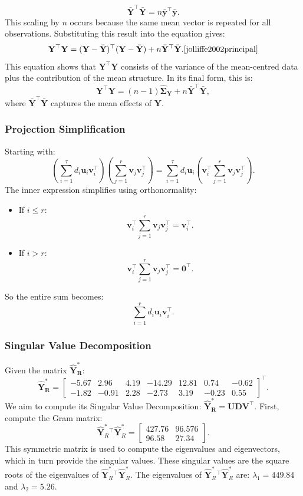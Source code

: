 \documentclass[11pt]{report} %
\begin{document}
\[
   \bar{\mathbf{Y}}^\top \bar{\mathbf{Y}} = n \bar{\mathbf{y}}^\top \bar{\mathbf{y}}.
\]
This scaling by \( n \) occurs because the same mean vector is repeated for all observations. Substituting this result into the equation gives:
\[
   \mathbf{Y}^\top \mathbf{Y} = (\mathbf{Y} - \bar{\mathbf{Y}})^\top (\mathbf{Y} - \bar{\mathbf{Y}}) + n \bar{\mathbf{Y}}^\top \bar{\mathbf{Y}}.\cite{jolliffe2002principal}
\]
This equation shows that \( \mathbf{Y}^\top \mathbf{Y} \) consists of the variance of the mean-centred data plus the contribution of the mean structure. In its final form, this is:
\[
\mathbf{Y}^\top\mathbf{Y} = (n-1)\mathbf{\hat{\Sigma}_Y}+n\mathbf{\bar{Y}}^\top\mathbf{\bar{Y}},
\]
where $\mathbf{\bar{Y}}^\top\mathbf{\bar{Y}}$ captures the mean effects of $\mathbf{Y}$. 

\subsubsection{Projection Simplification}
\label{proj}
Starting with:
\[
\left( \sum_{i=1}^{\tau} d_i \mathbf{u}_i \mathbf{v}_i^\top \right)
\left( \sum_{j=1}^{r} \mathbf{v}_j \mathbf{v}_j^\top \right)
= \sum_{i=1}^{\tau} d_i \mathbf{u}_i 
\left( \mathbf{v}_i^\top \sum_{j=1}^{r} \mathbf{v}_j \mathbf{v}_j^\top \right).
\]
The inner expression simplifies using orthonormality:
\begin{itemize}
  \item If \( i \leq r \): 
  \[
  \mathbf{v}_i^\top \sum_{j=1}^{r} \mathbf{v}_j \mathbf{v}_j^\top = \mathbf{v}_i^\top.
  \]
  \item If \( i > r \): 
  \[
  \mathbf{v}_i^\top \sum_{j=1}^{r} \mathbf{v}_j \mathbf{v}_j^\top = \mathbf{0}^\top.
  \]
\end{itemize}
\noindent So the entire sum becomes:
\[
\sum_{i=1}^{r} d_i \mathbf{u}_i \mathbf{v}_i^\top.
\]

\subsubsection{Singular Value Decomposition}
\label{RRR SVD}
Given the matrix \( \mathbf{\hat{Y}^*_R} \):
\[
\mathbf{\hat{Y}^*_R} =
\begin{bmatrix}
-5.67 & 2.96 & 4.19 & -14.29 & 12.81 & 0.74 & -0.62 \\
-1.82 & -0.91 & 2.28 & -2.73 & 3.19 & -0.23 & 0.55
\end{bmatrix}^{\top}.
\]
We aim to compute its Singular Value Decomposition: 
$
\mathbf{\hat{Y}^*_R} = \mathbf{U D V}^\top.
$
First, compute the Gram matrix:
\[
\hat{\mathbf{Y}}_R^*{}^\top \hat{\mathbf{Y}}_R^* =
\begin{bmatrix}
427.76 & 96.576 \\
96.58 & 27.34
\end{bmatrix}.
\]
This symmetric matrix is used to compute the eigenvalues and eigenvectors, which in turn provide the singular values. These singular values are the square roots of the eigenvalues of \( \hat{\mathbf{Y}}_R^*{}^\top \hat{\mathbf{Y}}_R^* \). The eigenvalues of \( \hat{\mathbf{Y}}_R^*{}^\top \hat{\mathbf{Y}}_R^* \) are: \( \lambda_1 = 449.84 \) and \( \lambda_2 = 5.26 \).
\end{document}
